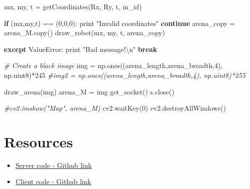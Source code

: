 \documentclass[]{article}
\newenvironment{Shaded}{}{}
\newcommand{\DecValTok}[1]{\textcolor[rgb]{0.25,0.63,0.44}{{#1}}}
\newcommand{\CharTok}[1]{\textcolor[rgb]{0.25,0.44,0.63}{{#1}}}
\newcommand{\StringTok}[1]{\textcolor[rgb]{0.25,0.44,0.63}{{#1}}}
\newcommand{\CommentTok}[1]{\textcolor[rgb]{0.38,0.63,0.69}{\textit{{#1}}}}
\newcommand{\ControlFlowTok}[1]{\textcolor[rgb]{0.00,0.44,0.13}{\textbf{{#1}}}}
\newcommand{\OperatorTok}[1]{\textcolor[rgb]{0.40,0.40,0.40}{{#1}}}
\newcommand{\BuiltInTok}[1]{{#1}}
\newcommand{\PreprocessorTok}[1]{\textcolor[rgb]{0.74,0.48,0.00}{{#1}}}
\newcommand{\NormalTok}[1]{{#1}}
\begin{document}
\begin{Shaded}
\begin{Highlighting}[]
            \NormalTok{mx, my, t }\OperatorTok{=} \NormalTok{getCoordinates(Rx, Ry, t, m_id)}

            \ControlFlowTok{if} \NormalTok{(mx,my,t) }\OperatorTok{==} \NormalTok{(}\DecValTok{0}\NormalTok{,}\DecValTok{0}\NormalTok{,}\DecValTok{0}\NormalTok{):}
                \BuiltInTok{print} \StringTok{"Invalid coordinates"}
                \ControlFlowTok{continue}
            \NormalTok{arena_copy }\OperatorTok{=} \NormalTok{arena_M.copy()}
            \NormalTok{draw_robot(mx, my, t, arena_copy)}
            
        \ControlFlowTok{except} \PreprocessorTok{ValueError}\NormalTok{:}
            \BuiltInTok{print} \StringTok{"Bad message!}\CharTok{\textbackslash{}n}\StringTok{"}
            \ControlFlowTok{break}

\CommentTok{# Create a black image}
\NormalTok{img }\OperatorTok{=} \NormalTok{np.ones((arena_length,arena_breadth,}\DecValTok{4}\NormalTok{), np.uint8)}\OperatorTok{*}\DecValTok{245}
\CommentTok{#img2 = np.ones((arena_length,arena_breadth,4), np.uint8)*255}

\NormalTok{draw_arena(img)}
\NormalTok{arena_M }\OperatorTok{=} \NormalTok{img}
\NormalTok{get_socket()}
\NormalTok{s.close()}

\CommentTok{#cv2.imshow("Map", arena_M)}
\NormalTok{cv2.waitKey(}\DecValTok{0}\NormalTok{)}
\NormalTok{cv2.destroyAllWindows()}
                                
\end{Highlighting}
\end{Shaded}

\section{Resources}
\begin{itemize}
	\item \href{https://github.com/eyantrainternship/eYSIP_2015_Marker_based_Robot_Localisation/blob/master/Task-7/Marker-based%20Localization/src/Server.py}{Server code - Github link}
	\item \href{https://github.com/eyantrainternship/eYSIP_2015_Marker_based_Robot_Localisation/blob/master/Task-7/Marker-based%20Localization/src/Client2.py}{Client code - Github link}
\end{itemize}
\end{document}
